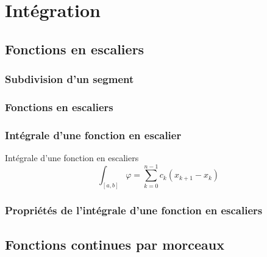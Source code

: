 \chapter{Intégration} %
\label{chap:Intégration}

\section{Fonctions en escaliers} %
\label{sec:Fonctions en escaliers}

\subsection{Subdivision d'un segment} %
\label{sub:Subdivision d'un segment}

\subsection{Fonctions en escaliers} %
\label{sub:Fonctions en escaliers}

\subsection{Intégrale d'une fonction en escalier} %
\label{sub:Intégrale d'une fonction en escalier}

\begin{Definition}[colbacktitle=red!75!black]{Intégrale d'une fonction en escaliers}{}
\begin{equation}
  \int_{[a,b]}^{} \varphi = \sum_{k=0}^{n-1} c_k (x _{k+1} - x_k)
\end{equation}
\end{Definition}

\subsection{Propriétés de l'intégrale d'une fonction en escaliers} %
\label{sub:Propriétés de l'intégrale d'une fonction en escaliers}


\section{Fonctions continues par morceaux} %
\label{sec:Fonctions continues par morceaux}

